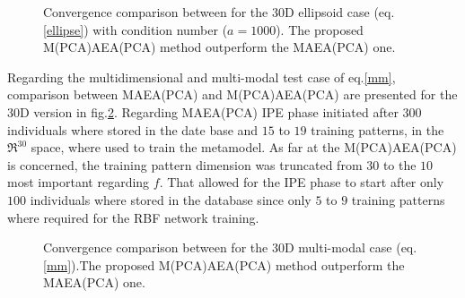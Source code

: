 \begin{figure}[h!]
\begin{minipage}[b]{1\linewidth}
 \centering
\end{minipage}
\caption{Convergence comparison between for the 30D ellipsoid case (eq. \ref{ellipse}) with condition number ($a = 1000$). The proposed M(PCA)AEA(PCA) method outperform the MAEA(PCA) one.} 
\label{Ellt3-m}
\end{figure}


Regarding the multidimensional and multi-modal test case of eq.\ref{mm}, comparison between MAEA(PCA) and M(PCA)AEA(PCA) are presented for the 30D version in fig.\ref{mmt3m}. Regarding MAEA(PCA)  IPE phase initiated after $300$ individuals where stored in the date base and $15$ to $19$ training patterns, in the $\Re^{30}$ space, where used to train the  metamodel. As far at the M(PCA)AEA(PCA) is concerned, the training pattern dimension was truncated from $30$ to the $10$ most important regarding $f$. That allowed for the  IPE phase to start after only $100$ individuals where stored in the database since only $5$ to $9$ training patterns where required for the RBF network training.

\begin{figure}[h!]
\begin{minipage}[b]{1\linewidth}
 \centering
\end{minipage}
\caption{Convergence comparison between for the 30D multi-modal case (eq. \ref{mm}).The proposed M(PCA)AEA(PCA) method outperform the MAEA(PCA) one.} 
\label{mmt3m}
\end{figure}

